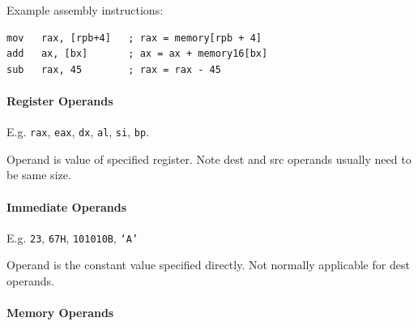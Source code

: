 \documentclass[twocolumn,english]{article}
\begin{document}
Example assembly instructions:

\noindent 
\begin{lstlisting}[basicstyle={\footnotesize\ttfamily},frame=single]
mov   rax, [rpb+4]   ; rax = memory[rpb + 4]
add   ax, [bx]       ; ax = ax + memory16[bx]
sub   rax, 45        ; rax = rax - 45
\end{lstlisting}



\paragraph{Register Operands}

E.g. \texttt{rax}, \texttt{eax}, \texttt{dx}, \texttt{al}, \texttt{si},
\texttt{bp}.

Operand is value of specified register. Note dest and src operands
usually need to be same size.


\paragraph{Immediate Operands}

E.g. \texttt{23}, \texttt{67H}, \texttt{101010B}, \texttt{`A'}

Operand is the constant value specified directly. Not normally applicable
for dest operands.


\paragraph{Memory Operands}
\end{document}
